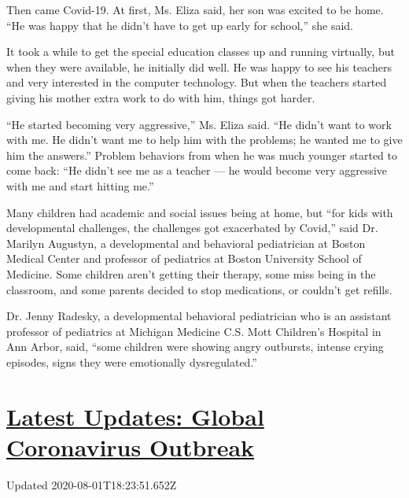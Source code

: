Then came Covid-19. At first, Ms. Eliza said, her son was excited to be
home. ``He was happy that he didn't have to get up early for school,''
she said.

It took a while to get the special education classes up and running
virtually, but when they were available, he initially did well. He was
happy to see his teachers and very interested in the computer
technology. But when the teachers started giving his mother extra work
to do with him, things got harder.

``He started becoming very aggressive,'' Ms. Eliza said. ``He didn't
want to work with me. He didn't want me to help him with the problems;
he wanted me to give him the answers.'' Problem behaviors from when he
was much younger started to come back: ``He didn't see me as a teacher
--- he would become very aggressive with me and start hitting me.''

Many children had academic and social issues being at home, but ``for
kids with developmental challenges, the challenges got exacerbated by
Covid,'' said Dr. Marilyn Augustyn, a developmental and behavioral
pediatrician at Boston Medical Center and professor of pediatrics at
Boston University School of Medicine. Some children aren't getting their
therapy, some miss being in the classroom, and some parents decided to
stop medications, or couldn't get refills.

Dr. Jenny Radesky, a developmental behavioral pediatrician who is an
assistant professor of pediatrics at Michigan Medicine C.S. Mott
Children's Hospital in Ann Arbor, said, ``some children were showing
angry outbursts, intense crying episodes, signs they were emotionally
dysregulated.''

\hypertarget{latest-updates-global-coronavirus-outbreak}{%
\section{\texorpdfstring{\href{https://www.nytimes.com/2020/08/01/world/coronavirus-covid-19.html?action=click\&pgtype=Article\&state=default\&region=MAIN_CONTENT_1\&context=storylines_live_updates}{Latest
Updates: Global Coronavirus
Outbreak}}{Latest Updates: Global Coronavirus Outbreak}}\label{latest-updates-global-coronavirus-outbreak}}

Updated 2020-08-01T18:23:51.652Z

